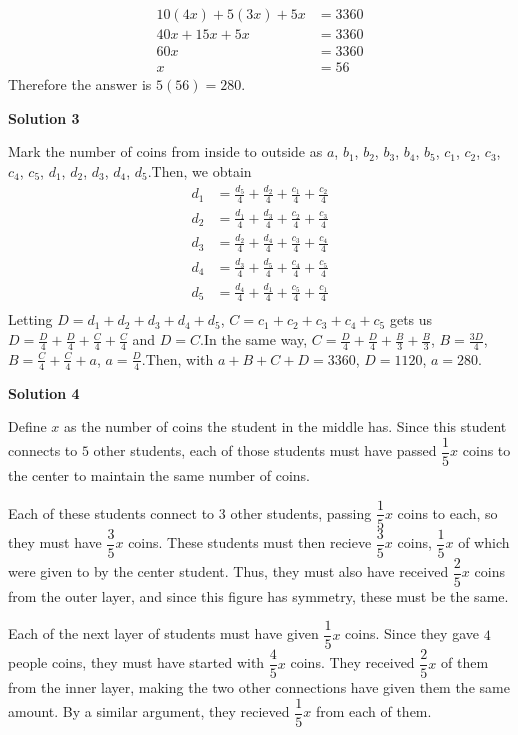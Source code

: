 \begin{enumerate}
 
 \begin{align*} 10(4x)+5(3x)+5x &= 3360\\ 40x+15x+5x &= 3360\\ 60x &= 3360\\ x &= 56 \end{align*}
Therefore the answer is $5(56) = \boxed{280}.$




\textbf{Solution 3}

Mark the number of coins from inside to outside as $a$, $b_1$, $b_2$, $b_3$, $b_4$, $b_5$, $c_1$, $c_2$, $c_3$, $c_4$, $c_5$, $d_1$, $d_2$, $d_3$, $d_4$, $d_5$.Then, we obtain
 \begin{align*} d_1 &= \frac{d_5}{4} + \frac{d_2}{4} + \frac{c_1}{4} + \frac{c_2}{4}\\ d_2 &= \frac{d_1}{4} + \frac{d_3}{4} + \frac{c_2}{4} + \frac{c_3}{4}\\ d_3 &= \frac{d_2}{4} + \frac{d_4}{4} + \frac{c_3}{4} + \frac{c_4}{4}\\ d_4 &= \frac{d_3}{4} + \frac{d_5}{4} + \frac{c_4}{4} + \frac{c_5}{4}\\ d_5 &= \frac{d_4}{4} + \frac{d_1}{4} + \frac{c_5}{4} + \frac{c_1}{4}\\ \end{align*}
Letting $D = d_1 + d_2 + d_3 + d_4 + d_5$, $C = c_1 + c_2 + c_3 + c_4 + c_5$ gets us $D = \frac{D}{4} + \frac{D}{4} + \frac{C}{4} + \frac{C}{4}$ and $D = C$.In the same way, $C = \frac{D}{4} + \frac{D}{4} + \frac{B}{3} + \frac{B}{3}$, $B = \frac{3D}{4}$, $B = \frac{C}{4} + \frac{C}{4} + a$, $a = \frac{D}{4}$.Then, with $a + B + C + D = 3360$, $D = 1120$, $a = \boxed{280}$.

 



\textbf{Solution 4}

Define $x$ as the number of coins the student in the middle has. Since this student connects to $5$ other students, each of those students must have passed $\dfrac15 x$ coins to the center to maintain the same number of coins.

 Each of these students connect to $3$ other students, passing $\dfrac15 x$ coins to each, so they must have $\dfrac35 x$ coins. These students must then recieve $\dfrac35 x$ coins, $\dfrac 15 x$ of which were given to by the center student. Thus, they must also have received $\dfrac25 x$ coins from the outer layer, and since this figure has symmetry, these must be the same.

 Each of the next layer of students must have given $\dfrac15 x$ coins. Since they gave $4$ people coins, they must have started with $\dfrac45 x$ coins. They received $\dfrac25 x$ of them from the inner layer, making the two other connections have given them the same amount. By a similar argument, they recieved $\dfrac15 x$ from each of them.


\end{enumerate}

